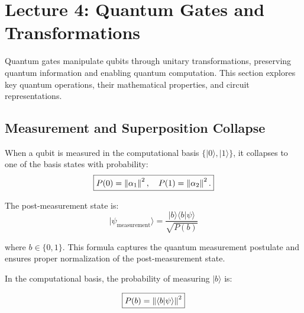 \section{Lecture 4: Quantum Gates and Transformations}\label{sec:lecture4}

Quantum gates manipulate qubits through unitary transformations, preserving
quantum information and enabling quantum computation. This section explores
key quantum operations, their mathematical properties, and circuit
representations.


\subsection*{Measurement and Superposition Collapse}

When a qubit is measured in the computational basis $\{|0\rangle,
|1\rangle\}$, it collapses to one of the basis states with probability:
\[
  \boxed{
    P(0) = \left\lVert\alpha_1\right\rVert^2, \quad P(1) = \left\lVert\alpha_2\right\rVert^2.
  }
\]

The post-measurement state is:
\[
  \boxed{
    |\psi_{\text{measurement}}\rangle = \frac{|b\rangle \langle b | \psi
    \rangle}{\sqrt{P(b)}}
  }
\]

\noindent
where $b \in \{0,1\}$. This formula captures the quantum measurement
postulate and ensures proper normalization of the post-measurement state.

\vspace{0.3cm}

In the computational basis, the probability of measuring $|b\rangle$ is:

\[
  \boxed{
    P(b) = \left\lVert\langle b | \psi \rangle\right\rVert^2
  }
\]



